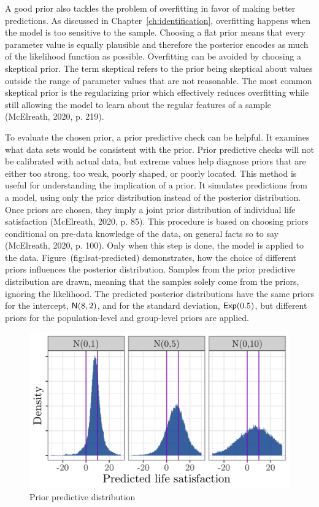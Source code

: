 \documentclass[a4, 12pt]{article}
\begin{document}
A good prior also tackles the problem of overfitting in favor of making better predictions. As discussed in Chapter~\ref{ch:identification}, overfitting happens when the model is too sensitive to the sample. Choosing a flat prior means that every parameter value is equally plausible and therefore the posterior encodes as much of the likelihood function as possible. Overfitting can be avoided by choosing a skeptical prior. The term skeptical refers to the prior being skeptical about values outside the range of parameter values that are not reasonable. The most common skeptical prior is the regularizing prior which effectively reduces overfitting while still allowing the model to learn about the regular features of a sample (McElreath, 2020, p. 219).

To evaluate the chosen prior, a prior predictive check can be helpful. It examines what data sets would be consistent with the prior. Prior predictive checks will not be calibrated with actual data, but extreme values help diagnose priors that are either too strong, too weak, poorly shaped, or poorly located. This method is useful for understanding the implication of a prior. It simulates predictions from a model, using only the prior distribution instead of the posterior distribution. Once priors are chosen, they imply a joint prior distribution of individual life satisfaction (McElreath, 2020, p. 85). This procedure is based on choosing priors conditional on pre-data knowledge of the data, on general facts so to say (McElreath, 2020, p. 100). Only when this step is done, the model is applied to the data.
Figure~(fig:lsat-predicted) demonstrates, how the choice of different priors influences the posterior distribution. Samples from the prior predictive distribution are drawn, meaning that the samples solely come from the priors, ignoring the likelihood. The predicted posterior distributions have the same priors for the intercept, \({\sf N}(8,2)\), and for the standard deviation, \({\sf Exp}(0.5)\), but different priors for the population-level and group-level priors are applied.

\begin{figure}[H]

{\centering \includegraphics[width=0.8\linewidth,]{../figures/prior_predict} 

}

\caption{Prior predictive distribution}\label{fig:lsat-predicted}
\end{figure}
\end{document}
